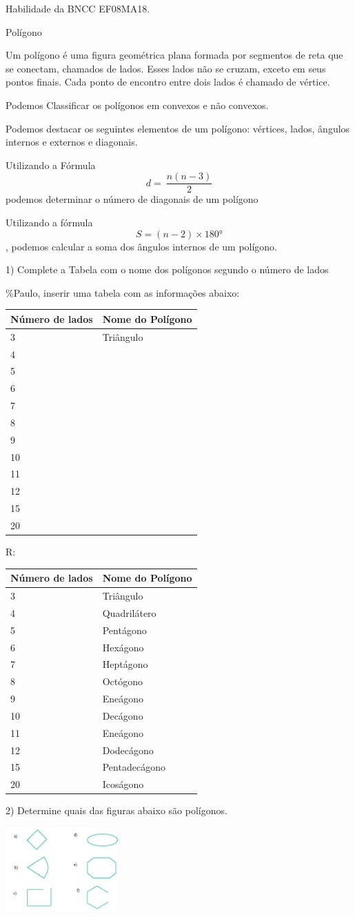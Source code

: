 Habilidade da BNCC EF08MA18.

Polígono

Um polígono é uma figura geométrica plana formada por segmentos de reta
que se conectam, chamados de lados. Esses lados não se cruzam, exceto em
seus pontos finais. Cada ponto de encontro entre dois lados é chamado de
vértice.

Podemos Classificar os polígonos em convexos e não convexos.

Podemos destacar os seguintes elementos de um polígono: vértices, lados,
ângulos internos e externos e diagonais.

Utilizando a Fórmula \[d = \ \frac{n(n - 3)}{2}\] podemos determinar o
número de diagonais de um polígono

Utilizando a fórmula \[S = (n - 2) \times 180°\], podemos calcular a
soma dos ângulos internos de um polígono.


1) Complete a Tabela com o nome dos polígonos segundo o número de lados

\%Paulo, inserir uma tabela com as informações abaixo:

\begin{longtable}[]{@{}ll@{}}
\toprule
Número de lados & Nome do Polígono\tabularnewline
\midrule
\endhead
3 & Triângulo\tabularnewline
4 & ~\tabularnewline
5 & ~\tabularnewline
6 & ~\tabularnewline
7 & ~\tabularnewline
8 & ~\tabularnewline
9 & ~\tabularnewline
10 & ~\tabularnewline
11 & ~\tabularnewline
12 & ~\tabularnewline
15 & ~\tabularnewline
20 & ~\tabularnewline
\bottomrule
\end{longtable}

R:

\begin{longtable}[]{@{}ll@{}}
\toprule
Número de lados & Nome do Polígono\tabularnewline
\midrule
\endhead
3 & Triângulo\tabularnewline
4 & Quadrilátero\tabularnewline
5 & Pentágono\tabularnewline
6 & Hexágono\tabularnewline
7 & Heptágono\tabularnewline
8 & Octógono\tabularnewline
9 & Eneágono\tabularnewline
10 & Decágono\tabularnewline
11 & Eneágono\tabularnewline
12 & Dodecágono\tabularnewline
15 & Pentadecágono\tabularnewline
20 & Icoságono\tabularnewline
\bottomrule
\end{longtable}

2) Determine quais das figuras abaixo são polígonos.

\includegraphics[width=1.7in,height=1.26763in]{./imgSAEB_8_MAT/media/image7.png}

